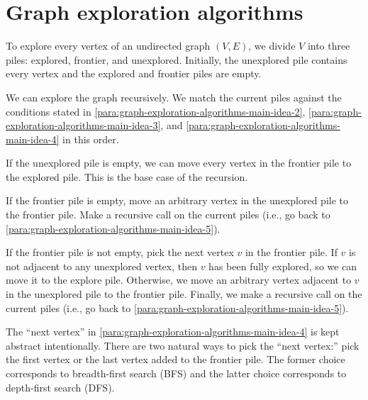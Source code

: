 \documentclass{amsart}
\begin{document}
\section{Graph exploration algorithms}
\label{sec:graph-exploration-algorithms}

\para
\label{para:graph-exploration-algorithms-main-idea-1}
To explore every vertex of an undirected graph $(V,E)$, we divide $V$ into three piles: explored, frontier, and unexplored.
Initially, the unexplored pile contains every vertex and the explored and frontier piles are empty.

\medskip
\para
\label{para:graph-exploration-algorithms-main-idea-5}
We can explore the graph recursively.
We match the current piles against the conditions stated in
\ref{para:graph-exploration-algorithms-main-idea-2},
\ref{para:graph-exploration-algorithms-main-idea-3}, and
\ref{para:graph-exploration-algorithms-main-idea-4}
in this order.

\medskip
\para
\label{para:graph-exploration-algorithms-main-idea-2}
If the unexplored pile is empty, we can move every vertex in the frontier pile to the explored pile.
This is the base case of the recursion.

\medskip
\para
\label{para:graph-exploration-algorithms-main-idea-3}
If the frontier pile is empty, move an arbitrary vertex in the unexplored pile to the frontier pile.
Make a recursive call on the current piles (i.e., go back to \ref{para:graph-exploration-algorithms-main-idea-5}).

\medskip
\para
\label{para:graph-exploration-algorithms-main-idea-4}
If the frontier pile is not empty, pick the next vertex $v$ in the frontier pile.
If $v$ is not adjacent to any unexplored vertex, then $v$ has been fully explored, so we can move it to the explore pile.
Otherwise, we move an arbitrary vertex adjacent to $v$ in the unexplored pile to the frontier pile.
Finally, we make a recursive call on the current piles (i.e., go back to \ref{para:graph-exploration-algorithms-main-idea-5}).

\begin{rmk}
  \label{rmk:graph-exploration-algorithms-next-vertex}
  The ``next vertex'' in \ref{para:graph-exploration-algorithms-main-idea-4} is kept abstract intentionally.
  There are two natural ways to pick the ``next vertex:'' pick the first vertex or the last vertex added to the frontier pile.
  The former choice corresponds to breadth-first search (BFS) and the latter choice corresponds to depth-first search (DFS).
\end{rmk}
\end{document}
